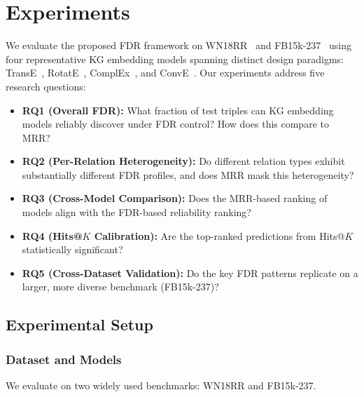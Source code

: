 \section{Experiments}
\label{sec:experiments}

We evaluate the proposed FDR framework on WN18RR~\cite{dettmers2018convolutional} and FB15k-237~\cite{toutanova2015representing} using four representative KG embedding models spanning distinct design paradigms: TransE~\cite{bordes2013translating}, RotatE~\cite{sun2019rotate}, ComplEx~\cite{trouillon2016complex}, and ConvE~\cite{dettmers2018convolutional}.
Our experiments address five research questions:

\begin{itemize}
    \item \textbf{RQ1 (Overall FDR):} What fraction of test triples can KG embedding models reliably discover under FDR control? How does this compare to MRR?
    \item \textbf{RQ2 (Per-Relation Heterogeneity):} Do different relation types exhibit substantially different FDR profiles, and does MRR mask this heterogeneity?
    \item \textbf{RQ3 (Cross-Model Comparison):} Does the MRR-based ranking of models align with the FDR-based reliability ranking?
    \item \textbf{RQ4 (Hits@$K$ Calibration):} Are the top-ranked predictions from Hits@$K$ statistically significant?
    \item \textbf{RQ5 (Cross-Dataset Validation):} Do the key FDR patterns replicate on a larger, more diverse benchmark (FB15k-237)?
\end{itemize}

\subsection{Experimental Setup}
\label{subsec:setup}

\subsubsection{Dataset and Models}

We evaluate on two widely used benchmarks: WN18RR and FB15k-237.

